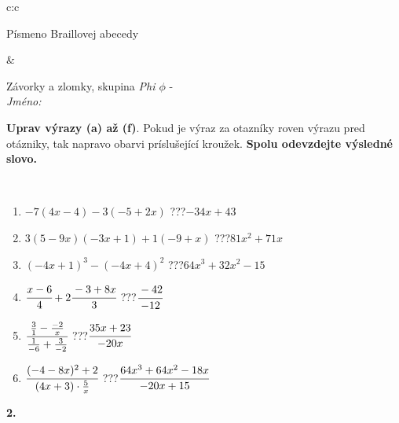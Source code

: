\documentclass[10pt]{report}
\begin{document}
\begin{tabular}{c:c}
\begin{minipage}[c][104.5mm][t]{0.5\linewidth}
\begin{center}
\begin{minipage}{0.20\linewidth}
\begin{center}
{\small Písmeno Braillovej abecedy}
\end{center}
\end{minipage}
\end{center}
\end{minipage}
&
\begin{minipage}[c][104.5mm][t]{0.5\linewidth}
\begin{center}
\vspace{7mm}
{\huge Závorky a zlomky, skupina \textit{Phi $\phi$} -}\\[5mm]
\textit{Jméno:}\phantom{xxxxxxxxxxxxxxxxxxxxxxxxxxxxxxxxxxxxxxxxxxxxxxxxxxxxxxxxxxxxxxxxx}\\[5mm]
\begin{minipage}{0.95\linewidth}
\begin{center}
\textbf{Uprav výrazy (a) až (f)}. Pokud je výraz za otazníky roven výrazu pred otázniky, tak napravo obarvi príslušející kroužek. \textbf{Spolu odevzdejte výsledné slovo.}
\end{center}
\end{minipage}
\\[1mm]
\begin{minipage}{0.79\linewidth}
\begin{center}
\begin{varwidth}{\linewidth}
\begin{enumerate}
\normalsize
\item $-7(4x-4)-3(-5+2x)$\quad \dotfill\; ???\;\dotfill \quad $-34x+43$
\item $3(5-9x)(-3x+1)+1(-9+x)$\quad \dotfill\; ???\;\dotfill \quad $81x^2+71x$
\item $(-4x+1)^3-(-4x+4)^2$\quad \dotfill\; ???\;\dotfill \quad $64x^3+32x^2-15$
\item $\cfrac{x-6}{4}+2\cfrac{-3+8x}{3}$\quad \dotfill\; ???\;\dotfill \quad $\cfrac{-42}{-12}$
\item $\cfrac{\frac{3}{1}-\frac{-2}{x}}{\frac{1}{-6}+\frac{3}{-2}}$\quad \dotfill\; ???\;\dotfill \quad $\cfrac{35x+23}{-20x}$
\item $\cfrac{(-4-8x)^2+2}{(4x+3)\cdot\frac{5}{x}}$\quad \dotfill\; ???\;\dotfill \quad $\cfrac{64x^3+64x^2-18x}{-20x+15}$
\end{enumerate}
\end{varwidth}
\end{center}
\end{minipage}
\begin{minipage}{0.20\linewidth}
\begin{center}
{\Huge\bfseries 2.} \\[2mm]

\end{center}
\end{minipage}
\end{center}
\end{minipage}
\end{tabular}
\end{document}
